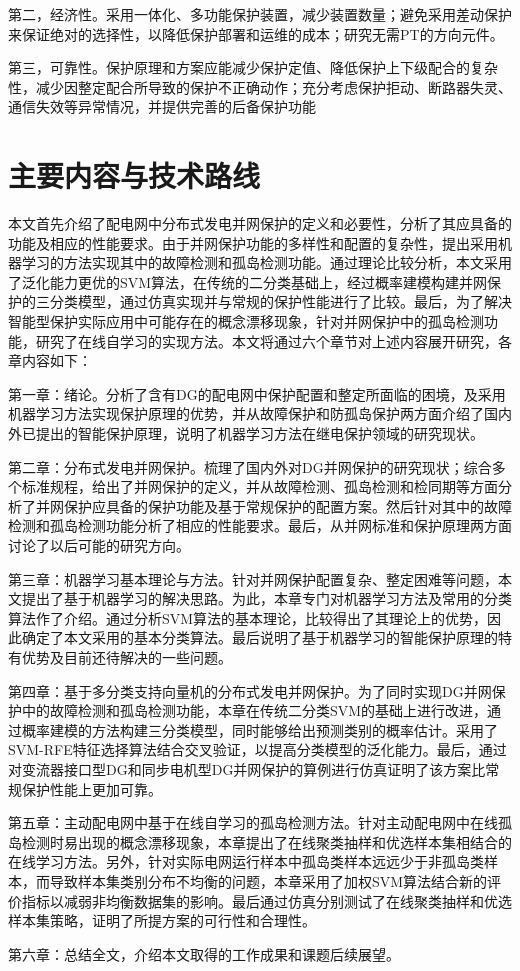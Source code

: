 第二，经济性。采用一体化、多功能保护装置，减少装置数量；避免采用差动保护来保证绝对的选择性，以降低保护部署和运维的成本；研究无需PT的方向元件。

第三，可靠性。保护原理和方案应能减少保护定值、降低保护上下级配合的复杂性，减少因整定配合所导致的保护不正确动作；充分考虑保护拒动、断路器失灵、通信失效等异常情况，并提供完善的后备保护功能

\section{主要内容与技术路线}

本文首先介绍了配电网中分布式发电并网保护的定义和必要性，分析了其应具备的功能及相应的性能要求。由于并网保护功能的多样性和配置的复杂性，提出采用机器学习的方法实现其中的故障检测和孤岛检测功能。通过理论比较分析，本文采用了泛化能力更优的SVM算法，在传统的二分类基础上，经过概率建模构建并网保护的三分类模型，通过仿真实现并与常规的保护性能进行了比较。最后，为了解决智能型保护实际应用中可能存在的概念漂移现象，针对并网保护中的孤岛检测功能，研究了在线自学习的实现方法。本文将通过六个章节对上述内容展开研究，各章内容如下：

第一章：绪论。分析了含有DG的配电网中保护配置和整定所面临的困境，及采用机器学习方法实现保护原理的优势，并从故障保护和防孤岛保护两方面介绍了国内外已提出的智能保护原理，说明了机器学习方法在继电保护领域的研究现状。

第二章：分布式发电并网保护。梳理了国内外对DG并网保护的研究现状；综合多个标准规程，给出了并网保护的定义，并从故障检测、孤岛检测和检同期等方面分析了并网保护应具备的保护功能及基于常规保护的配置方案。然后针对其中的故障检测和孤岛检测功能分析了相应的性能要求。最后，从并网标准和保护原理两方面讨论了以后可能的研究方向。

第三章：机器学习基本理论与方法。针对并网保护配置复杂、整定困难等问题，本文提出了基于机器学习的解决思路。为此，本章专门对机器学习方法及常用的分类算法作了介绍。通过分析SVM算法的基本理论，比较得出了其理论上的优势，因此确定了本文采用的基本分类算法。最后说明了基于机器学习的智能保护原理的特有优势及目前还待解决的一些问题。

第四章：基于多分类支持向量机的分布式发电并网保护。为了同时实现DG并网保护中的故障检测和孤岛检测功能，本章在传统二分类SVM的基础上进行改进，通过概率建模的方法构建三分类模型，同时能够给出预测类别的概率估计。采用了SVM-RFE特征选择算法结合交叉验证，以提高分类模型的泛化能力。最后，通过对变流器接口型DG和同步电机型DG并网保护的算例进行仿真证明了该方案比常规保护性能上更加可靠。

第五章：主动配电网中基于在线自学习的孤岛检测方法。针对主动配电网中在线孤岛检测时易出现的概念漂移现象，本章提出了在线聚类抽样和优选样本集相结合的在线学习方法。另外，针对实际电网运行样本中孤岛类样本远远少于非孤岛类样本，而导致样本集类别分布不均衡的问题，本章采用了加权SVM算法结合新的评价指标以减弱非均衡数据集的影响。最后通过仿真分别测试了在线聚类抽样和优选样本集策略，证明了所提方案的可行性和合理性。

第六章：总结全文，介绍本文取得的工作成果和课题后续展望。
